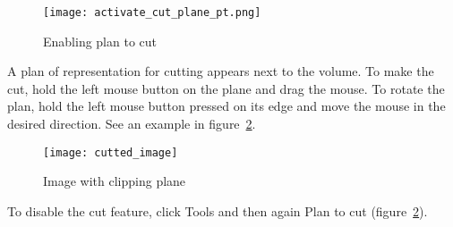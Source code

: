 \begin{figure}[!htb]
\centering
\texttt{[image: activate\_cut\_plane\_pt.png]}
\caption{Enabling plan to cut}
\label{fig:activate_cut_plane}
\end{figure}

A plan of representation for cutting appears next to the volume. To make the cut, hold the left mouse button on the plane and drag the mouse. To rotate the plan, hold the left mouse button  pressed on its edge and move the mouse in the desired direction. See an example in figure~\ref{fig:cutted_image}.

\begin{figure}[!htb]
\centering
\texttt{[image: cutted\_image]}
\caption{Image with clipping plane}
\label{fig:cutted_image}
\end{figure}


To disable the cut feature, click Tools and then again Plan to cut (figure~\ref{fig:cutted_image}).